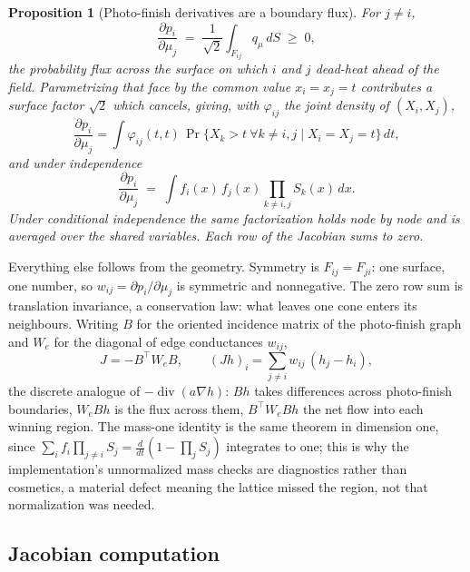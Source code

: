 \documentclass[11pt]{article}
\newtheorem{proposition}{Proposition}
\begin{document}
\begin{proposition}[Photo-finish derivatives are a boundary flux]
\label{prop:tie}
For $j\ne i$,
\begin{equation}\label{eq:flux}
\frac{\partial p_i}{\partial\mu_j}
 \;=\;\frac{1}{\sqrt2}\int_{F_{ij}}q_\mu\,dS\;\ge\;0 ,
\end{equation}
the probability flux across the surface on which $i$ and $j$ dead-heat
ahead of the field. Parametrizing that face by the common value
$x_i=x_j=t$ contributes a surface factor $\sqrt2$ which cancels, giving,
with $\varphi_{ij}$ the joint density of $(X_i,X_j)$,
\begin{equation}\label{eq:tiecorr}
\frac{\partial p_i}{\partial\mu_j}
 =\int \varphi_{ij}(t,t)\,
   \Pr\{X_k>t\ \forall k\ne i,j \mid X_i=X_j=t\}\,dt ,
\end{equation}
and under independence
\begin{equation}\label{eq:tie}
\frac{\partial p_i}{\partial \mu_j}
  \;=\; \int f_i(x)\,f_j(x)\prod_{k\ne i,j}S_k(x)\,dx .
\end{equation}
Under conditional independence the same factorization holds node by node
and is averaged over the shared variables. Each row of the Jacobian sums
to zero.
\end{proposition}

Everything else follows from the geometry. Symmetry is $F_{ij}=F_{ji}$:
one surface, one number, so $w_{ij}=\partial p_i/\partial\mu_j$ is
symmetric and nonnegative. The zero row sum is translation invariance, a
conservation law: what leaves one cone enters its neighbours. Writing $B$
for the oriented incidence matrix of the photo-finish graph and $W_e$ for
the diagonal of edge conductances $w_{ij}$,
\[
   J=-B^{\top}W_eB,
   \qquad
   (Jh)_i=\sum_{j\ne i}w_{ij}\,(h_j-h_i),
\]
the discrete analogue of $-\operatorname{div}(a\nabla h)$: $Bh$ takes
differences across photo-finish boundaries, $W_eBh$ is the flux across
them, $B^{\top}W_eBh$ the net flow into each winning region. The
mass-one identity is the same theorem in dimension one, since
$\sum_i f_i\prod_{j\ne i}S_j = \tfrac{d}{dt}(1-\prod_j S_j)$
integrates to one; this is why the implementation's unnormalized mass
checks are diagnostics rather than cosmetics, a material defect meaning
the lattice missed the region, not that normalization was needed.

\subsection{Jacobian computation}\label{sec:jaccomp}
\end{document}

